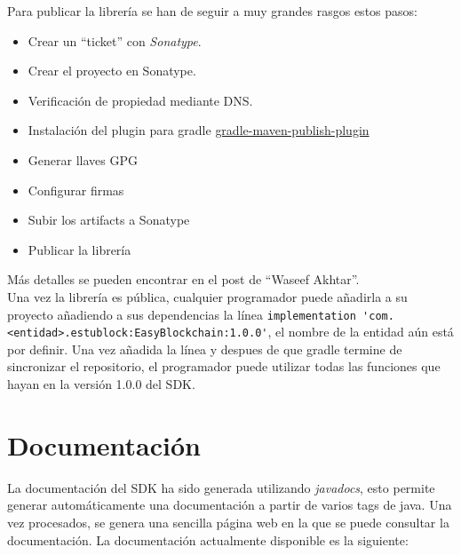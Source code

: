 Para publicar la librería se han de seguir a muy grandes rasgos estos pasos:
\begin{itemize}
\item Crear un ``ticket'' con \emph{Sonatype}\cite{sonatype}.
\item Crear el proyecto en Sonatype.
\item Verificación de propiedad mediante DNS.
\item Instalación del plugin para gradle \href{https://github.com/vanniktech/gradle-maven-publish-plugin}{gradle-maven-publish-plugin}
\item Generar llaves GPG
\item Configurar firmas
\item Subir los artifacts a Sonatype
\item Publicar la librería
\end{itemize}

Más detalles se pueden encontrar en el post de ``Waseef Akhtar''\cite{waseef}. \\

Una vez la librería es pública, cualquier programador puede añadirla a su proyecto añadiendo a sus dependencias la línea \verb|implementation 'com.<entidad>.estublock:EasyBlockchain:1.0.0'|, el nombre de la entidad aún está por definir. Una vez añadida la línea y despues de que gradle termine de sincronizar el repositorio, el programador puede utilizar todas las funciones que hayan en la versión 1.0.0 del SDK.


\section{Documentación}

La documentación del SDK ha sido generada utilizando \emph{javadocs}, esto permite generar automáticamente una documentación a partir de varios tags de java. Una vez procesados, se genera una sencilla página web en la que se puede consultar la documentación. La documentación actualmente disponible es la siguiente: 

